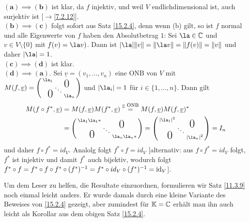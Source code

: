 \documentclass[../../main.tex]{subfiles}
\begin{document}
\begin{cproof}
$\boldsymbol{(a)\implies(b)}$ ist klar, da $f$ injektiv, und weil $V$ endlichdimensional ist, auch surjektiv ist [$\to$\ref{7.2.12}].\\
		
\noindent$\boldsymbol{(b)\implies(c)}$ folgt sofort aus Satz \ref{15.2.4}, denn wenn (b) gilt, so ist $f$ normal und alle Eigenwerte von $f$ haben den Absolutbetrag $1$: Sei $\la\in \C$ und $v\in V\setminus\{0\}$ mit $f(v)=\la v)$. Dann ist $\vert\la\vert\| v\|=\|\la v\|=\|f(v)\|=\|v\|$ und daher $\vert \la\vert=1$. \\
		
\noindent$\boldsymbol{(c)\implies(d)}$ ist klar.\\
		
\noindent$\boldsymbol{(d)\implies(a)}.$ Sei $\underline{v}=(v_1,\ldots ,v_n)$ eine ONB von $V$ mit $M(f,\underline{v})=\left(\begin{smallmatrix}
\la_1 & & \llap{$\overset{\blap{\LARGE 0}}{~}$} \\
& \ddots &\\
\rlap{\tlap{\LARGE 0}} & & \la_n
\end{smallmatrix}\right)$ und $\vert \la_i\vert=1$ für $i\in\{1,\ldots ,n\}$. Dann gilt
\begin{align*}
M(f\circ f^*,\v)&=M(f,\v)M(f^*,\v)\stackrel{\v\text{ ONB}}{=}M(f,\underline{v})M(f,\v)^*\\
&=\left(\begin{smallmatrix}
\la_1\la_1* & & \llap{$\overset{\blap{\LARGE 0}}{~}$} \\
& \ddots &\\
\rlap{\tlap{\LARGE 0}} & & \la_n\la_n*
\end{smallmatrix}\right)
=\left(\begin{smallmatrix}
\vert \la_1\vert^2 & & \llap{$\overset{\blap{\LARGE 0}}{~}$} \\
& \ddots &\\
\rlap{\tlap{\LARGE 0}} & & \vert \la_n\vert^2
\end{smallmatrix}\right)=I_n
\end{align*}
und daher $f\circ f^*=id_V$. Analolg folgt $f^*\circ f=id_V$ [alternativ: aus $f\circ f^*=id_V$ folgt, $f^*$ ist injektiv und damit $f^*$ auch bijektiv, wodurch folgt $f^*\circ f=f^*\circ f\circ f^*\circ(f^*)^{-1}=f^*\circ id_V\circ (f^*)^{-1}=\operatorname{id}_V$].
\end{cproof}

\noindent Um dem Leser zu helfen, die Resultate einzuordnen, formulieren wir Satz \ref{11.3.9} noch einmal leicht anders. Er wurde damals durch eine kleine Variante des Beweises von \ref{15.2.4} gezeigt, aber zumindest für $\mathbb K=\mathbb C$ erhält man ihn auch leicht als Korollar aus dem obigen Satz \ref{15.2.4}.
\end{document}
